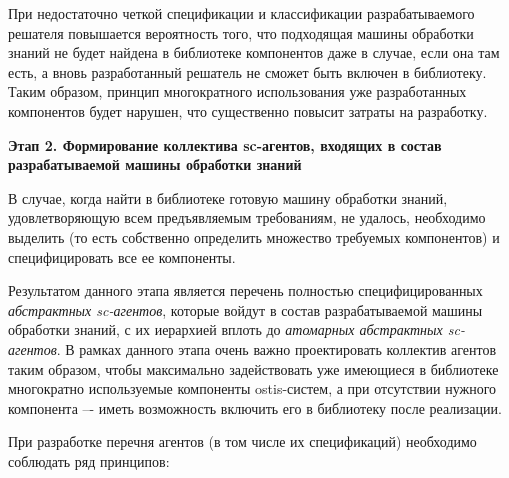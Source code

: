 При недостаточно четкой спецификации и классификации разрабатываемого решателя повышается вероятность того, что подходящая машины обработки знаний не будет найдена в библиотеке компонентов даже в случае, если она там есть, а вновь разработанный решатель не сможет быть включен в библиотеку. Таким образом, принцип многократного использования уже разработанных компонентов будет нарушен, что существенно повысит затраты на разработку.

\textbf{Этап 2. Формирование коллектива sc-агентов, входящих в состав разрабатываемой машины обработки знаний}

В случае, когда найти в библиотеке готовую машину обработки знаний, удовлетворяющую всем предъявляемым требованиям, не удалось, необходимо выделить (то есть собственно определить множество требуемых компонентов) и специфицировать все ее компоненты.

Результатом данного этапа является перечень полностью специфицированных \textit{абстрактных sc-агентов}, которые войдут в состав разрабатываемой машины обработки знаний, с их иерархией вплоть до \textit{атомарных абстрактных sc-агентов}. В рамках данного этапа очень важно проектировать коллектив агентов таким образом, чтобы максимально задействовать уже имеющиеся в библиотеке многократно используемые компоненты ostis-систем, а при отсутствии нужного компонента –- иметь возможность включить его в библиотеку после реализации.

При разработке перечня агентов (в том числе их спецификаций) необходимо соблюдать ряд принципов:

